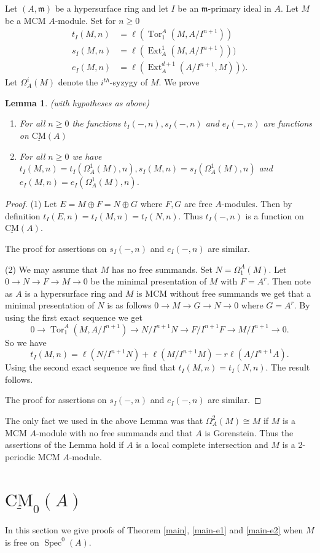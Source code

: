 \documentclass{amsart}
\newcommand{\m}{\mathfrak{m} }
\newcommand{\rt}{\rightarrow}
\newcommand{\Tor}{\operatorname{Tor}}
\newcommand{\Spec}{\operatorname{Spec}}
\newcommand{\CMS}{\operatorname{\underline{CM}}}
\newcommand{\Ext}{\operatorname{Ext}}
\theoremstyle{plain}
\newtheorem{lemma}[theorem]{Lemma}
\theoremstyle{definition}
\theoremstyle{remark}
\begin{document}
\s Let $(A,\m)$ be a hypersurface ring and let $I$ be an $\m$-primary ideal in $A$. Let $M$ be a MCM $A$-module.
Set for $n \geq 0$
\begin{align*}
  t_I(M,n) &=  \ell(\Tor^A_1(M, A/I^{n+1})) \\
  s_I(M,n) &= \ell(\Ext^1_A(M, A/I^{n+1}))) \\
  e_I(M, n) &= \ell(\Ext^{d+1}_A( A/I^{n+1}, M))).
\end{align*}
Let $\Omega^i_A(M)$ denote the $i^{th}$-syzygy of $M$.
We prove
\begin{lemma}\label{basic}
(with hypotheses as above)
\begin{enumerate}[\rm (1)]
  \item For all $n \geq 0$  the functions $t_I(-,n), s_I(-,n)$ and $e_I(-,n)$ are functions on $\CMS(A)$
  \item For all $n \geq 0$ we have $t_I(M,n) = t_I(\Omega^1_A(M),n), s_I(M,n) = s_I(\Omega^1_A(M),n)$ and $e_I(M,n) = e_I(\Omega^1_A(M),n)$.
\end{enumerate}
\end{lemma}
\begin{proof}
(1) Let $E = M \oplus F = N \oplus G$ where $F, G$ are free $A$-modules. Then by definition
$t_I(E, n) = t_I(M,n) = t_I(N,n)$. Thus $t_I(-, n)$ is a function on $\CMS(A)$.

 The proof for assertions on $s_I(-, n)$ and $e_I(-, n)$ are similar.

(2) We may assume that $M$ has no free summands. Set $N = \Omega^A_1(M)$.  Let $ 0 \rt N  \rt F \rt M \rt 0$ be the minimal presentation of $M$ with $F = A^r$. Then note as $A$ is a hypersurface ring and $M$ is MCM without free summands we get that a minimal presentation of $N$ is as follows $0 \rt M \rt G \rt N \rt 0$ where $G = A^r$.
By using the first exact sequence we get
\[
0 \rt \Tor^A_1(M, A/I^{n+1}) \rt N/I^{n+1}N \rt F/I^{n+1}F \rt M/I^{n+1} \rt 0.
\]
So we have
\[
t_I(M,n) = \ell(N/I^{n+1}N) + \ell(M/I^{n+1}M) - r\ell(A/I^{n+1}A).
\]
Using the second exact sequence we find that $t_I(M,n) = t_I(N,n)$. The result follows.

The proof for assertions on $s_I(-, n)$ and $e_I(-, n)$ are similar.
\end{proof}
\s\label{ci-lem} The only fact we used in the above Lemma was that $\Omega^2_A(M) \cong M$ if $M$ is a MCM $A$-module with no free summands and that $A$ is Gorenstein. Thus the assertions of the Lemma hold if
$A$ is a local complete intersection and $M$ is a 2-periodic MCM $A$-module.
\section{$\CMS_0(A)$}
In this section we give proofs of Theorem \ref{main}, \ref{main-e1} and \ref{main-e2} when $M$ is free on $\Spec^0(A)$.
\end{document}
